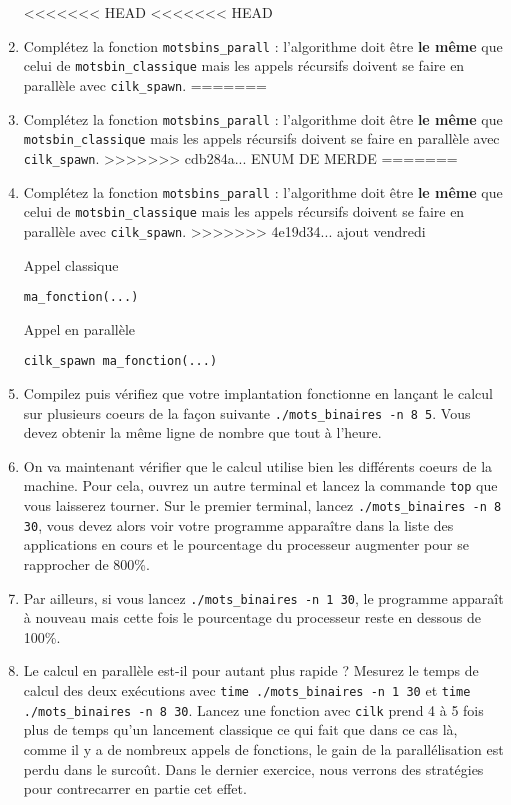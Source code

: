 \documentclass{cours}
\newcommand{\lsti}[1]{\lstinline{#1}{}}
\begin{document}
\begin{exercice}
\begin{enumerate}
<<<<<<< HEAD
<<<<<<< HEAD
\item Complétez la fonction \lsti{motsbins_parall} : l'algorithme doit être
  \textbf{le même} que celui de \lsti{motsbin_classique} mais les appels récursifs doivent se faire en parallèle avec \lsti{cilk_spawn}.
=======
\item Complétez la fonction \lsti{motsbins_parall} : l'algorithme doit être \textbf{le même} que \lsti{motsbin_classique} mais les appels récursifs doivent se faire en parallèle avec \lsti{cilk_spawn}.
>>>>>>> cdb284a... ENUM DE MERDE
=======
\item Complétez la fonction \lsti{motsbins_parall} : l'algorithme doit être
  \textbf{le même} que celui de \lsti{motsbin_classique} mais les appels récursifs doivent se faire en parallèle avec \lsti{cilk_spawn}.
>>>>>>> 4e19d34... ajout vendredi

Appel classique

\begin{lstlisting}
ma_fonction(...)
\end{lstlisting}

Appel en parallèle

\begin{lstlisting}
cilk_spawn ma_fonction(...)
\end{lstlisting}

\item Compilez puis vérifiez que votre implantation fonctionne en lançant le calcul sur plusieurs coeurs de la façon suivante \lsti{./mots_binaires -n 8 5}. Vous devez obtenir la même ligne de nombre que tout à l'heure.

\item On va maintenant vérifier que le calcul utilise bien les différents coeurs de la machine. Pour cela, ouvrez un autre terminal et lancez la commande \lsti{top} que vous laisserez tourner. Sur le premier terminal, lancez \lsti{./mots_binaires -n 8 30}, vous devez alors voir votre programme apparaître dans la liste des applications en cours et le pourcentage du processeur augmenter pour se rapprocher de 800\%.

\item Par ailleurs, si vous lancez \lsti{./mots_binaires -n 1 30}, le programme apparaît à nouveau mais cette fois le pourcentage du processeur reste en dessous de 100\%.

\item Le calcul en parallèle est-il pour autant plus rapide ? Mesurez le temps de calcul des deux exécutions avec \lsti{time ./mots_binaires -n 1 30} et \lsti{time ./mots_binaires -n 8 30}. Lancez une fonction avec \lsti{cilk} prend 4 à 5 fois plus de temps qu'un lancement classique ce qui fait que dans ce cas là, comme il y a de nombreux appels de fonctions, le gain de la parallélisation est perdu dans le surcoût. Dans le dernier exercice, nous verrons des stratégies pour contrecarrer en partie cet effet. 

\end{enumerate}

\end{exercice}
\end{document}
